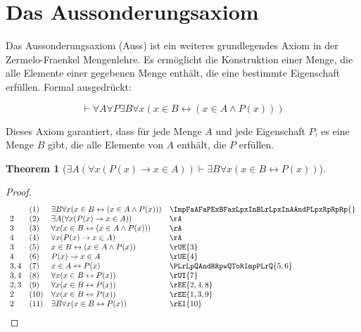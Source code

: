\documentclass{book}
\theoremstyle{plain}
\newtheorem{theorem}{Theorem}
\theoremstyle{remark}
\theoremstyle{definition}
\begin{document}
\section{Das Aussonderungsaxiom}
Das Aussonderungsaxiom (Auss) ist ein weiteres grundlegendes Axiom in der Zermelo-Fraenkel Mengenlehre. Es ermöglicht die Konstruktion einer Menge, die alle Elemente einer gegebenen Menge enthält, die eine bestimmte Eigenschaft erfüllen. Formal ausgedrückt:

\label{ImpFaAFaPExBFaxLpxInBLrLpxInAAndPLpxRpRpRp}
\[
\vdash\forall A \forall P \exists B \forall x (x \in B \leftrightarrow (x \in A \land P(x)))
\]

Dieses Axiom garantiert, dass für jede Menge \( A \) und jede Eigenschaft \( P \), es eine Menge \( B \) gibt, die alle Elemente von \( A \) enthält, die \( P \) erfüllen.

\label{ExALpFaxLpPLpxRpToxInARpRpImpExBFaxLpxInBLrPLpxRpRp}
\begin{theorem}[\(\exists A(\forall x(P(x)\rightarrow x\in A))\vdash \exists B \forall x (x \in B \leftrightarrow P(x))\)]
\end{theorem}
\begin{proof}
	\[
	\begin{array}{llll}
		& (1) & \exists B \forall x (x \in B \leftrightarrow (x \in A \land P(x))) & \ImpFaAFaPExBFaxLpxInBLrLpxInAAndPLpxRpRpRp{} \\
		2 & (2) & \exists A(\forall x(P(x)\rightarrow x\in A)) & \rA \\
		3 & (3) & \forall x (x \in B \leftrightarrow (x \in A \land P(x))) & \rA \\
		4 & (4) & \forall x(P(x)\rightarrow x\in A) & \rA \\
		3 & (5) & x \in B \leftrightarrow (x \in A \land P(x)) & \rUE{3} \\
		4 & (6) & P(x)\rightarrow x\in A & \rUE{4} \\
		3,4 & (7) & x\in A\leftrightarrow P(x) & \PLrLpQAndRRpwQToRImpPLrQ{5,6} \\
		3,4 & (8) & \forall x(x\in B\leftrightarrow P(x))& \rUI{7} \\  
		2,3 & (9) & \forall x(x\in B\leftrightarrow P(x))& \rEE{2,4,8} \\
		2 & (10) & \forall x(x\in B\leftrightarrow P(x))& \rEE{1,3,9} \\
		2 & (11) & \exists B\forall x(x\in B\leftrightarrow P(x))& \rEI{10} \\		  
	\end{array}
	\]
\end{proof}
\end{document}
